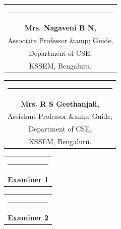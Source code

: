 \documentclass[a4paper]{article}
\begin{document}
\begin{titlepage}
\begin{tcolorbox}[colframe=black, colback=white, boxrule=2pt, arc=0pt,
			outer arc=0pt]
			\noindent %
			\begin{minipage}[t]{0.5\textwidth}
				\begin{tabular}[t]{@{}c}
					\rule{10em}{0.4pt}\\
					\textbf{Mrs. Nagaveni B N,} \\
					Associate Professor \&amp; Guide, \\
					Department of CSE, \\
					KSSEM, Bengaluru.\\
				\end{tabular}
			\end{minipage}%
			\begin{minipage}[t]{0.5\textwidth}
				\begin{flushright}
					\begin{tabular}[t]{@{}c}
						\rule{10em}{0.4pt}\\
						\textbf{Mrs. R S Geethanjali,} \\
						Assistant Professor \&amp; Guide, \\
						Department of CSE, \\
						KSSEM, Bengaluru.\\
					\end{tabular}
				\end{flushright}
			\end{minipage}
			
			\vspace{1.5cm}
			\noindent %
			\begin{minipage}[t]{0.5\textwidth}
				\begin{tabular}[t]{@{}c}
					\rule{10em}{0.4pt}\\
					\textbf{Examiner 1} 
				\end{tabular}
			\end{minipage}%
			\begin{minipage}[t]{0.5\textwidth}
				\begin{flushright}
					\begin{tabular}[t]{@{}c}
					\rule{10em}{0.4pt}\\
					\textbf{Examiner 2} 
					\end{tabular}
				\end{flushright}
			\end{minipage}
			
		\end{tcolorbox}
	\end{titlepage}
\end{document}

